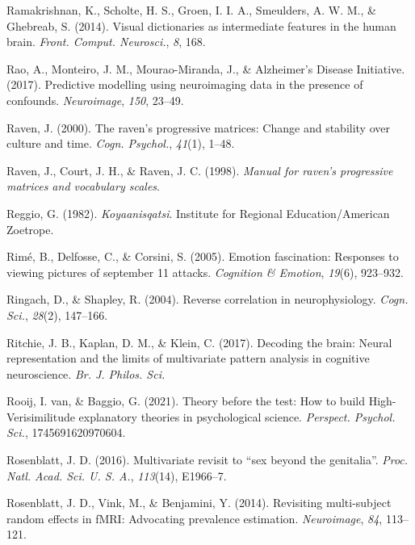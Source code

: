 \documentclass[11pt,american,a4paper,oneside,]{memoir} %
\begin{document}
\leavevmode\hypertarget{ref-Ramakrishnan2014-ki}{}%
Ramakrishnan, K., Scholte, H. S., Groen, I. I. A., Smeulders, A. W. M., \& Ghebreab, S. (2014). Visual dictionaries as intermediate features in the human brain. \emph{Front. Comput. Neurosci.}, \emph{8}, 168.

\leavevmode\hypertarget{ref-Rao2017-bw}{}%
Rao, A., Monteiro, J. M., Mourao-Miranda, J., \& Alzheimer's Disease Initiative. (2017). Predictive modelling using neuroimaging data in the presence of confounds. \emph{Neuroimage}, \emph{150}, 23--49.

\leavevmode\hypertarget{ref-Raven2000-hs}{}%
Raven, J. (2000). The raven's progressive matrices: Change and stability over culture and time. \emph{Cogn. Psychol.}, \emph{41}(1), 1--48.

\leavevmode\hypertarget{ref-Raven1998-om}{}%
Raven, J., Court, J. H., \& Raven, J. C. (1998). \emph{Manual for raven's progressive matrices and vocabulary scales}.

\leavevmode\hypertarget{ref-Reggio1982-ex}{}%
Reggio, G. (1982). \emph{Koyaanisqatsi}. Institute for Regional Education/American Zoetrope.

\leavevmode\hypertarget{ref-rime2005brief}{}%
Rimé, B., Delfosse, C., \& Corsini, S. (2005). Emotion fascination: Responses to viewing pictures of september 11 attacks. \emph{Cognition \& Emotion}, \emph{19}(6), 923--932.

\leavevmode\hypertarget{ref-Ringach2004-nn}{}%
Ringach, D., \& Shapley, R. (2004). Reverse correlation in neurophysiology. \emph{Cogn. Sci.}, \emph{28}(2), 147--166.

\leavevmode\hypertarget{ref-Ritchie2017-gl}{}%
Ritchie, J. B., Kaplan, D. M., \& Klein, C. (2017). Decoding the brain: Neural representation and the limits of multivariate pattern analysis in cognitive neuroscience. \emph{Br. J. Philos. Sci.}

\leavevmode\hypertarget{ref-Van_Rooij2021-bk}{}%
Rooij, I. van, \& Baggio, G. (2021). Theory before the test: How to build High-Verisimilitude explanatory theories in psychological science. \emph{Perspect. Psychol. Sci.}, 1745691620970604.

\leavevmode\hypertarget{ref-Rosenblatt2016-oy}{}%
Rosenblatt, J. D. (2016). Multivariate revisit to ``sex beyond the genitalia''. \emph{Proc. Natl. Acad. Sci. U. S. A.}, \emph{113}(14), E1966--7.

\leavevmode\hypertarget{ref-Rosenblatt2014-az}{}%
Rosenblatt, J. D., Vink, M., \& Benjamini, Y. (2014). Revisiting multi-subject random effects in fMRI: Advocating prevalence estimation. \emph{Neuroimage}, \emph{84}, 113--121.
\end{document}
